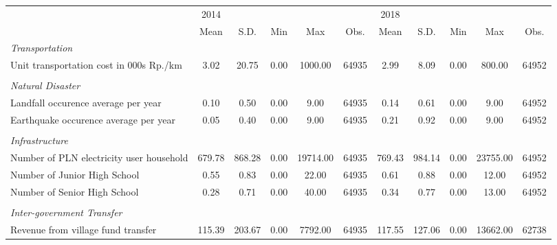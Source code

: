 \begin{tabular}{l*{2}{ccccc}}
\toprule
                &     2014&         &         &         &         &     2018&         &         &         &         \\
                &     Mean&     S.D.&      Min&      Max&     Obs.&     Mean&     S.D.&      Min&      Max&     Obs.\\
\midrule
\emph{Transportation}&         &         &         &         &         &         &         &         &         &         \\
\hspace{0.25cm} Unit transportation cost in 000s Rp./km&     3.02&    20.75&     0.00&  1000.00&    64935&     2.99&     8.09&     0.00&   800.00&    64952\\
\vspace{0.05em} \\ \emph{Natural Disaster}&         &         &         &         &         &         &         &         &         &         \\
\hspace{0.25cm} Landfall occurence average per year&     0.10&     0.50&     0.00&     9.00&    64935&     0.14&     0.61&     0.00&     9.00&    64952\\
\hspace{0.25cm} Earthquake occurence average per year&     0.05&     0.40&     0.00&     9.00&    64935&     0.21&     0.92&     0.00&     9.00&    64952\\
\vspace{0.05em} \\ \emph{Infrastructure}&         &         &         &         &         &         &         &         &         &         \\
\hspace{0.25cm} Number of PLN electricity user household&   679.78&   868.28&     0.00& 19714.00&    64935&   769.43&   984.14&     0.00& 23755.00&    64952\\
\hspace{0.25cm} Number of Junior High School&     0.55&     0.83&     0.00&    22.00&    64935&     0.61&     0.88&     0.00&    12.00&    64952\\
\hspace{0.25cm} Number of Senior High School&     0.28&     0.71&     0.00&    40.00&    64935&     0.34&     0.77&     0.00&    13.00&    64952\\
\vspace{0.05em} \\ \emph{Inter-government Transfer}&         &         &         &         &         &         &         &         &         &         \\
\hspace{0.25cm} Revenue from village fund transfer&   115.39&   203.67&     0.00&  7792.00&    64935&   117.55&   127.06&     0.00& 13662.00&    62738\\
\bottomrule
\end{tabular}
